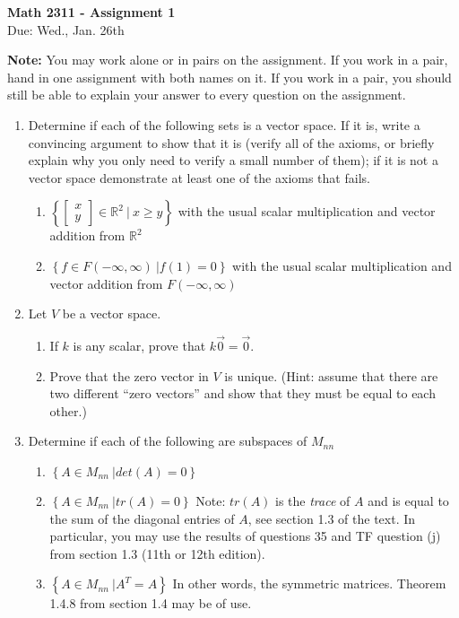 \documentclass[12pt]{article}
\newcommand {\DS} [1] {${\displaystyle #1}$}
\begin{document}
\thispagestyle{empty}

\begin{center}
\textbf{Math 2311  - Assignment 1}\\
Due: Wed., Jan. 26th
\end{center}

{\bf Note:} You may work alone or in pairs on the assignment. If you work in a pair, hand in one assignment with both names on it. If you work in a pair, you should still be able to explain your answer to every question on the assignment. 


\begin{enumerate}


\item
Determine if each of the following sets is a vector space.  If it is, write a convincing argument to show that it is (verify all of the axioms, or briefly explain why you only need to verify a small number of them); if it is not a vector space demonstrate at least one of the axioms that fails.
\begin{enumerate}
\item \DS{ \left\{ \left[ \begin{array}{c}
x \\
y
\end{array} \right] \in \mathbb{R}^2 \ | \ x \geq y \right\}} with the usual scalar multiplication and vector addition from $\mathbb{R}^2$
\item \DS{ \left\{f \in F(-\infty, \infty) \ | f(1) = 0 \right\}} with the usual scalar multiplication and vector addition from $F(-\infty, \infty)$
\end{enumerate}

\item
Let $V$ be a vector space.  
\begin{enumerate}
\item If $k$ is any scalar, prove that $k\vec{0} = \vec{0}$.
\item Prove that the zero vector in $V$ is unique. (Hint: assume that there are two different ``zero vectors'' and show that they must be equal to each other.)
\end{enumerate}


\item
Determine if each of the following are subspaces of $M_{nn}$
\begin{enumerate}
\item \DS{ \left\{A \in M_{nn} \ | det(A) = 0 \right\}}
\item \DS{ \left\{A \in M_{nn} \ | tr(A) = 0 \right\}} Note: $tr(A)$ is the \emph{trace} of $A$ and is equal to the sum of the diagonal entries of $A$, see section 1.3 of the text. In particular, you may use the results of questions 35 and TF question (j) from section 1.3 (11th or 12th edition). 
\item \DS{ \left\{A \in M_{nn} \ | A^T = A \right\}} In other words, the symmetric matrices. Theorem 1.4.8 from section 1.4 may be of use. 
\end{enumerate}


\end{enumerate}
\end{document}
